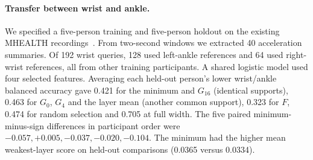 \paragraph{Transfer between wrist and ankle.}
We specified a five-person training and five-person holdout on the existing MHEALTH recordings~\citep{banos2014mhealth}. From two-second windows we extracted 40 acceleration summaries. Of 192 wrist queries, 128 used left-ankle references and 64 used right-wrist references, all from other training participants. A shared logistic model used four selected features. Averaging each held-out person's lower wrist/ankle balanced accuracy gave 0.421 for the minimum and $G_{16}$ (identical supports), 0.463 for $G_0$, $G_4$ and the layer mean (another common support), 0.323 for $F$, 0.474 for random selection and 0.705 at full width. The five paired minimum-minus-sign differences in participant order were $-0.057,+0.005,-0.037,-0.020,-0.104$. The minimum had the higher mean weakest-layer score on held-out comparisons (0.0365 versus 0.0334).
